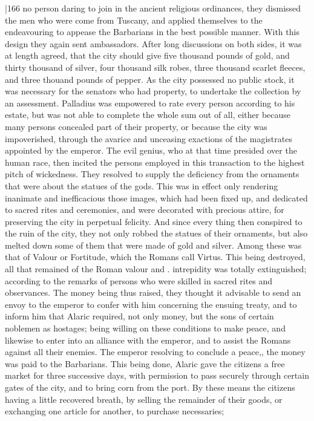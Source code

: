 |166 no person daring to join in the ancient religious ordinances, they dismissed the men who were come from Tuscany, and applied themselves to the endeavouring to appease the Barbarians in the best possible manner. With this design they again sent ambassadors. After long discussions on both sides, it was at length agreed, that the city should give five thousand pounds of gold, and thirty thousand of silver, four thousand silk robes, three thousand scarlet fleeces, and three thouand pounds of pepper. As the city possessed no public stock, it was necessary for the senators who had property, to undertake the collection by an assessment. Palladius was empowered to rate every person according to his estate, but was not able to complete the whole sum out of all, either because many persons concealed part of their property, or because the city was impoverished, through the avarice and unceasing exactions of the magistrates appointed by the emperor. The evil genius, who at that time presided over the human race, then incited the persons employed in this transaction to the highest pitch of wickedness. They resolved to supply the deficiency from the ornaments that were about the statues of the gods. This was in effect only rendering inanimate and inefficacious those images, which had been fixed up, and dedicated to sacred rites and ceremonies, and were decorated with precious attire, for preserving the city in perpetual felicity. And since every thing then conspired to the ruin of the city, they not only robbed the statues of their ornaments, but also melted down some of them that were made of gold and silver. Among these was that of Valour or Fortitude, which the Romans call Virtus. This being destroyed, all that remained of the Roman valour and . intrepidity was totally extinguished; according to the remarks of persons who were skilled in sacred rites and observances. The money being thus raised, they thought it advisable to send an envoy to the emperor to confer with him concerning the ensuing treaty, and to inform him that Alaric required, not only money, but the sons of certain noblemen as hostages; being willing on these conditions to make peace, and likewise to enter into an alliance with the emperor, and to assist the Romans against all their enemies. The emperor resolving to conclude a peace,, the money was paid to the Barbarians. This being done, Alaric gave the citizens a free market for three successive days, with permission to pass securely through certain gates of the city, and to bring corn from the port. By these means the citizens having a little recovered breath, by selling the remainder of their goods, or exchanging one article for another, to purchase necessaries;
